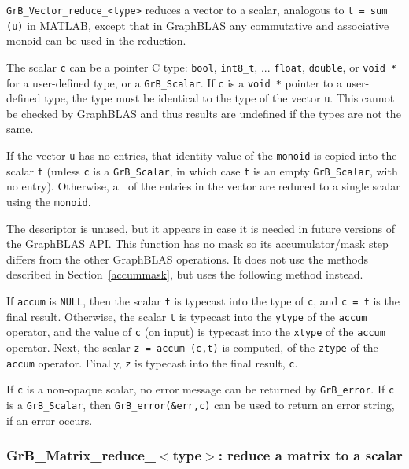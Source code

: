 \documentclass[12pt]{article}
\begin{document}
\verb'GrB_Vector_reduce_<type>'
reduces a vector to a scalar, analogous to \verb't = sum (u)' in MATLAB,
except that in GraphBLAS any commutative and associative monoid can be used
in the reduction.

The scalar \verb'c' can be a pointer C type: \verb'bool', \verb'int8_t', ...
\verb'float', \verb'double', or \verb'void *' for a user-defined type,
or a \verb'GrB_Scalar'.
If \verb'c' is a \verb'void *' pointer to a user-defined type,
the type must be identical to the type of the vector \verb'u'.
This cannot be checked by GraphBLAS and thus results are undefined if the
types are not the same.

If the vector \verb'u' has no entries, that identity value of the \verb'monoid'
is copied into the scalar \verb't' (unless \verb'c' is a \verb'GrB_Scalar',
in which case \verb't' is an empty \verb'GrB_Scalar', with no entry).
Otherwise, all of the entries in the
vector are reduced to a single scalar using the \verb'monoid'.

The descriptor is unused, but it appears in case it is needed in future
versions of the GraphBLAS API.
This function has no mask so its accumulator/mask step differs from the other
GraphBLAS operations.  It does not use the methods described in
Section~\ref{accummask}, but uses the following method instead.

If \verb'accum' is \verb'NULL', then the scalar \verb't' is typecast into the
type of \verb'c', and \verb'c = t' is the final result.  Otherwise, the scalar
\verb't' is typecast into the \verb'ytype' of the \verb'accum' operator, and
the value of \verb'c' (on input) is typecast into the \verb'xtype' of the
\verb'accum' operator.  Next, the scalar \verb'z = accum (c,t)' is computed, of
the \verb'ztype' of the \verb'accum' operator.  Finally, \verb'z' is typecast
into the final result, \verb'c'.

If \verb'c' is a non-opaque scalar, no error message can be returned by
\verb'GrB_error'.  If \verb'c' is a \verb'GrB_Scalar', then
\verb'GrB_error(&err,c)' can be used to return an error string, if an error
occurs.

\subsubsection{{\sf GrB\_Matrix\_reduce\_$<$type$>$:} reduce a matrix to a scalar}
\label{reduce_matrix_to_scalar}
\end{document}
